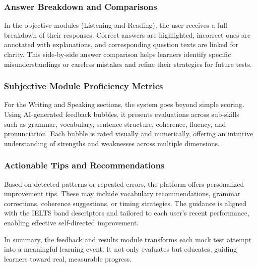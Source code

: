 \documentclass[a4paper,12pt]{article}
\begin{document}
\vspace{0.4cm}
\subsubsection{Answer Breakdown and Comparisons}

In the objective modules (Listening and Reading), the user receives a full breakdown of their responses. Correct answers are highlighted, incorrect ones are annotated with explanations, and corresponding question texts are linked for clarity. This side-by-side answer comparison helps learners identify specific misunderstandings or careless mistakes and refine their strategies for future tests.

\vspace{0.4cm}
\subsubsection{Subjective Module Proficiency Metrics}

For the Writing and Speaking sections, the system goes beyond simple scoring. Using AI-generated feedback bubbles, it presents evaluations across sub-skills such as grammar, vocabulary, sentence structure, coherence, fluency, and pronunciation. Each bubble is rated visually and numerically, offering an intuitive understanding of strengths and weaknesses across multiple dimensions.

\vspace{0.4cm}
\subsubsection{Actionable Tips and Recommendations}

Based on detected patterns or repeated errors, the platform offers personalized improvement tips. These may include vocabulary recommendations, grammar corrections, coherence suggestions, or timing strategies. The guidance is aligned with the IELTS band descriptors and tailored to each user's recent performance, enabling effective self-directed improvement.

\vspace{0.4cm}

In summary, the feedback and results module transforms each mock test attempt into a meaningful learning event. It not only evaluates but educates, guiding learners toward real, measurable progress.

\vspace{0.5cm}
\end{document}
